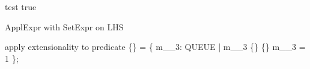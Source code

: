\begin{zed}[QUEUE]\end{zed}
\begin{theorem}{test}
    true
\end{theorem}

ApplExpr with SetExpr on LHS
\begin{zproof}[test]
apply extensionality to predicate \{\} = \{  m\_\_3: QUEUE | m\_\_3 \in  \{\} \land  \{\} m\_\_3 = 1 \};
\end{zproof}